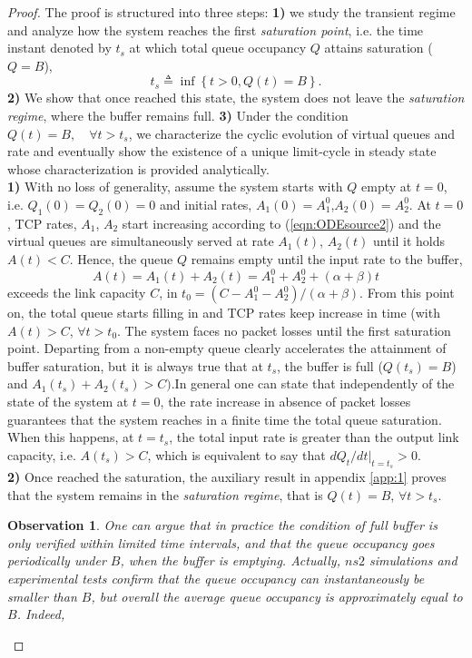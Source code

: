 \documentclass[a4paper,oneside, 11pt]{article}
\newtheorem{obs}[theorem]{Observation}
\begin{document}
\begin{proof}
The proof is structured into three steps: \textbf{1)} we  study the transient regime
and analyze how the system reaches the first \textit{saturation point},
i.e. the time instant denoted by $t_s$ at which total queue occupancy $Q$ attains saturation ($Q=B$),
$$\label{def:t_sat}
t_s \triangleq  \inf\left \{ t>0, Q(t)=B \right \}.
$$
\textbf{2)} We show that once reached this state, the system does not leave the \textit{saturation regime}, where the buffer remains full.
\textbf{3)} Under the condition $Q(t)=B, \quad  \forall t>t_s$, we characterize the cyclic evolution of virtual queues and rate and eventually
show the existence of a unique limit-cycle in steady state whose characterization is provided analytically.\\
\textbf{1)} With no loss of generality, assume  the system starts with $Q$ empty at $t=0$, i.e. $Q_1(0)=Q_2(0)=0$ and initial rates, $A_1(0)=A_1^0$,$A_2(0)=A_2^0$.
At $t=0$, TCP rates, $A_1$, $A_2$ start increasing  according to (\ref{eqn:ODEsource2}) and the virtual queues are simultaneously served at rate $A_1(t)$, $A_2(t)$ until it holds $A(t)<C$.
Hence, the queue $Q$ remains empty until the input rate to the buffer, \\
$$A(t)=A_1(t)+A_2(t)=A_1^0+A_2^0+(\alpha+\beta)t$$
exceeds the link capacity $C$, in $t_0=(C-A_1^0-A_2^0)/(\alpha+\beta)$.
From this point on, the total queue starts filling in and TCP rates keep increase in time (with $A(t)>C$, $\forall t>t_0$.
The system faces no packet losses until the first saturation point.
Departing from a non-empty queue clearly accelerates the attainment of buffer saturation, but it is always true that
at $t_s$, the buffer is full ($Q(t_s)=B$) and $A_1(t_s)+A_2(t_s)>C)$.In general one can state that independently of the state of the system at $t=0$, the rate increase in absence of packet losses guarantees that the system reaches in a finite time  the total queue saturation. When this happens, at $t=t_s$, the total input rate is greater than the output link capacity, i.e. $A(t_s)>C$, which is equivalent to say that $dQ_t/dt|_{t=t_s}>0$.
\\\textbf{2)} Once reached the saturation, the auxiliary result in appendix \ref{app:1} proves that the system remains in the \textit{saturation regime}, that is $Q(t)=B$, $\forall t>t_s$.\begin{obs}
 One can argue that in practice the condition of full buffer is only verified within limited time intervals, and that the queue occupancy goes periodically under $B$, when the buffer is emptying. Actually, $ns2$ simulations and experimental tests confirm that the queue occupancy can instantaneously be smaller than $B$, but overall the  average queue occupancy is approximately equal to $B$. Indeed,

\end{obs}
\end{proof}
\end{document}

